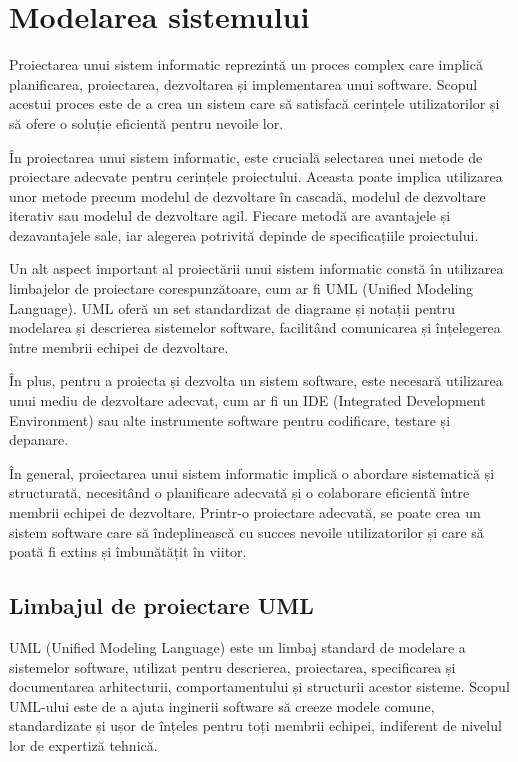 \clearpage
\section{Modelarea sistemului}

Proiectarea unui sistem informatic reprezintă un proces complex care implică planificarea, proiectarea, dezvoltarea și implementarea unui software. Scopul acestui proces este de a crea un sistem care să satisfacă cerințele utilizatorilor și să ofere o soluție eficientă pentru nevoile lor.

În proiectarea unui sistem informatic, este crucială selectarea unei metode de proiectare adecvate pentru cerințele proiectului. Aceasta poate implica utilizarea unor metode precum modelul de dezvoltare în cascadă, modelul de dezvoltare iterativ sau modelul de dezvoltare agil. Fiecare metodă are avantajele și dezavantajele sale, iar alegerea potrivită depinde de specificațiile proiectului.

Un alt aspect important al proiectării unui sistem informatic constă în utilizarea limbajelor de proiectare corespunzătoare, cum ar fi UML (Unified Modeling Language). UML oferă un set standardizat de diagrame și notații pentru modelarea și descrierea sistemelor software, facilitând comunicarea și înțelegerea între membrii echipei de dezvoltare.

În plus, pentru a proiecta și dezvolta un sistem software, este necesară utilizarea unui mediu de dezvoltare adecvat, cum ar fi un IDE (Integrated Development Environment) sau alte instrumente software pentru codificare, testare și depanare.

În general, proiectarea unui sistem informatic implică o abordare sistematică și structurată, necesitând o planificare adecvată și o colaborare eficientă între membrii echipei de dezvoltare. Printr-o proiectare adecvată, se poate crea un sistem software care să îndeplinească cu succes nevoile utilizatorilor și care să poată fi extins și îmbunătățit în viitor.
\subsection{Limbajul de proiectare UML}

UML (Unified Modeling Language) este un limbaj standard de modelare a sistemelor software, utilizat pentru descrierea, proiectarea, specificarea și documentarea arhitecturii, comportamentului și structurii acestor sisteme. Scopul UML-ului este de a ajuta inginerii software să creeze modele comune, standardizate și ușor de înțeles pentru toți membrii echipei, indiferent de nivelul lor de expertiză tehnică.

